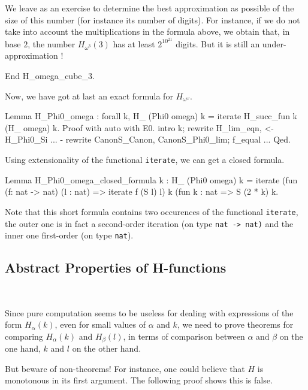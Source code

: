 We leave as an exercise to determine the best approximation as possible of
 the size of this number (for instance its number of digits).  For instance, if
we do not take into account the multiplications in the formula above,
we obtain that, in base $2$, the number $H_{\omega^3}(3)$ has at least
$2^{10^{21}}$  digits. But it is still an under-approximation !


\begin{Coqsrc}
End H_omega_cube_3.
\end{Coqsrc}




Now, we have got at last an exact formula for $H_{\omega^\omega}$.

\begin{Coqsrc}
Lemma H_Phi0_omega : forall k, H_ (Phi0 omega) k =
                               iterate H_succ_fun  k (H_ omega) k.
Proof with auto with E0.
  intro k; rewrite H_lim_eqn, <- H_Phi0_Si ...
  -  rewrite CanonS_Canon, CanonS_Phi0_lim;  f_equal ...
Qed.
\end{Coqsrc}

Using extensionality of the functional \texttt{iterate}, we can get a closed formula.

\begin{Coqsrc}
Lemma H_Phi0_omega_closed_formula k :
  H_ (Phi0 omega) k =
  iterate (fun (f: nat -> nat) (l : nat) => iterate  f (S l) l)
               k
               (fun k : nat => S (2 * k)%
               k.
\end{Coqsrc}




Note that this short formula contains two occurences of the functional \texttt{iterate}, the outer one is in fact a second-order iteration (on type \texttt{nat -> nat)}
and the inner one  first-order (on type \texttt{nat}). 


\subsection{Abstract Properties of H-functions}
~\label{sect:H-alpha-prop} 

Since pure computation seems to be useless for dealing with expressions of the form $H_\alpha(k)$, even for small values of $\alpha$ and $k$, we need to prove theorems for comparing $H_\alpha(k)$ and $H_\beta(l)$, in terms of comparison
between $\alpha$ and $\beta$ on the one hand, $k$ and $l$ on the other hand.

But beware of non-theorems! For instance, one could believe that $H$ is monotonous in its first argument. The following proof shows this is false.

